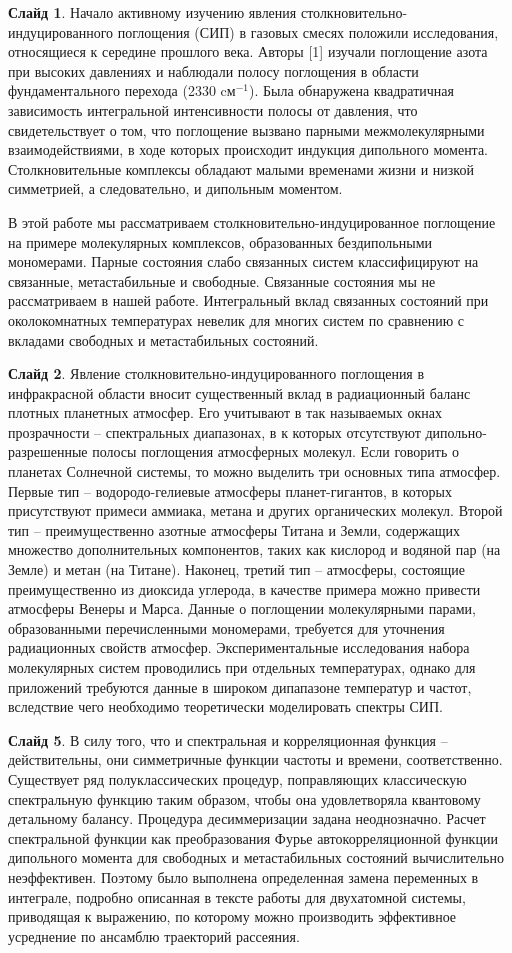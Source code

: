 \documentclass[12pt]{article}
\begin{document}
\textbf{Слайд 1}. Начало активному изучению явления столкновительно-индуцированного поглощения (СИП) в газовых смесях положили исследования, относящиеся к середине прошлого века. Авторы [1] изучали поглощение азота при высоких давлениях и наблюдали полосу поглощения в области фундаментального перехода (2330 cм$^{-1}$). Была обнаружена квадратичная зависимость интегральной интенсивности полосы от давления, что свидетельствует о том, что поглощение вызвано парными межмолекулярными взаимодействиями, в ходе которых происходит индукция дипольного момента. Столкновительные комплексы обладают малыми временами жизни и низкой симметрией, а следовательно, и дипольным моментом. \par 
В этой работе мы рассматриваем столкновительно-индуцированное поглощение на примере молекулярных комплексов, образованных бездипольными мономерами. Парные состояния слабо связанных систем классифицируют на связанные, метастабильные и свободные. Связанные состояния мы не рассматриваем в нашей работе. Интегральный вклад связанных состояний при околокомнатных температурах невелик для многих систем по сравнению с вкладами свободных и метастабильных состояний. \par 
\textbf{Слайд 2}. Явление столкновительно-индуцированного поглощения в инфракрасной области вносит существенный вклад в радиационный баланс плотных планетных атмосфер. Его учитывают в так называемых окнах прозрачности -- спектральных диапазонах, в к которых отсутствуют дипольно-разрешенные полосы поглощения атмосферных молекул. Если говорить о планетах Солнечной системы, то можно выделить три основных типа атмосфер. Первые тип -- водородо-гелиевые атмосферы планет-гигантов, в которых присутствуют примеси аммиака, метана и других органических молекул. Второй тип -- преимущественно азотные атмосферы Титана и Земли, содержащих множество дополнительных компонентов, таких как кислород и водяной пар (на Земле) и метан (на Титане). Наконец, третий тип -- атмосферы, состоящие преимущественно из диоксида углерода, в качестве примера можно привести атмосферы Венеры и Марса. Данные о поглощении молекулярными парами, образованными перечисленными мономерами, требуется для уточнения радиационных свойств атмосфер. Экспериментальные исследования набора молекулярных систем проводились при отдельных температурах, однако для приложений требуются данные в широком дипапазоне температур и частот, вследствие чего необходимо теоретически моделировать спектры СИП. \par 
\textbf{Слайд 5}. В силу того, что и спектральная и корреляционная функция -- действительны, они симметричные функции частоты и времени, соответственно. Существует ряд полуклассических процедур, поправляющих классическую спектральную функцию таким образом, чтобы она удовлетворяла квантовому детальному балансу. Процедура десиммеризации задана неоднозначно. Расчет спектральной функции как преобразования Фурье автокорреляционной функции дипольного момента для свободных и метастабильных состояний вычислительно неэффективен. Поэтому было выполнена определенная замена переменных в интеграле, подробно описанная в тексте работы для двухатомной системы, приводящая к выражению, по которому можно производить эффективное усреднение по ансамблю траекторий рассеяния. \par
\end{document}
